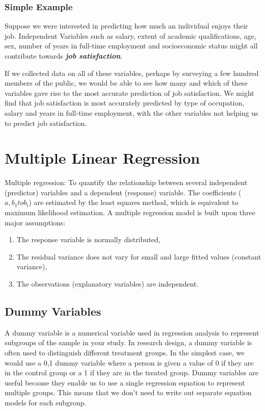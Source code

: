 \subsubsection{Simple Example}
Suppose we were interested in predicting how much an individual enjoys their job. Independent Variables such as salary, extent of academic qualifications, age, sex, number of years in full-time employment and socioeconomic status might all contribute towards \textbf{\textit{job satisfaction}}.

If we collected data on all of these variables, perhaps by surveying a few hundred members of the public, we would be able to see how many and which of these variables gave rise to the most accurate prediction of job satisfaction. We might find that job satisfaction is most accurately predicted by type of occupation, salary and years in full-time employment, with the other variables not helping us to predict job satisfaction.


\section{Multiple Linear Regression}
Multiple regression: To quantify the relationship between several independent (predictor) variables and a dependent (response) variable. The coefficients ($a, b_{1} to b_{i}$) are estimated by the least squares method, which is equivalent to maximum likelihood estimation. A multiple regression model is built upon three major assumptions:

\begin{enumerate}
	\item The response variable is normally distributed,
	\item The residual variance does not vary for small and large fitted values (constant variance),
	\item The observations (explanatory variables) are independent.
\end{enumerate}


\subsection{Dummy Variables}
A dummy variable is a numerical variable used in regression analysis to represent subgroups of the sample in your study. In research design, a dummy variable is often used to distinguish different treatment groups. In the simplest case, we would use a 0,1 dummy variable where a person is given a value of 0 if they are in the control group or a 1 if they are in the treated group. Dummy variables are useful because they enable us to use a single regression equation to represent multiple groups. This means that we don't need to write out separate equation models for each subgroup.




